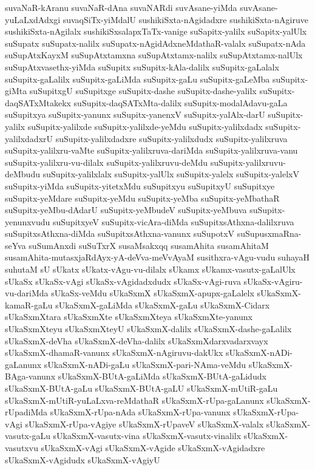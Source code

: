 {suvaNaR-kAranu
suvaNaR-dAna
suvaNARdi
suvAsane-yiMda
suvAsane-yuLaLxdAdxgi
suvaqSiTx-yiMdalU
sushikiSxta-nAgidadxre
sushikiSxta-nAgiruve
sushikiSxta-nAgilalx
sushikiSxsalapxTaTx-vanige
suSapitx-yalilx
suSapitx-yalUlx
suSupatx
suSupatx-nalilx
suSupatx-nAgidAdxneMdathaR-valalx
suSupatx-nAda
suSupAtxKayxM
suSupAtxtamxna
suSupAtxtamx-nalilx
suSupAtxtamx-nalUlx
suSupAtxvasethx-yiMda
suSupitx
suSupitx-kAla-dalilx
suSupitx-gaLalalx
suSupitx-gaLalilx
suSupitx-gaLiMda
suSupitx-gaLu
suSupitx-gaLeMba
suSupitx-giMta
suSupitxgU
suSupitxge
suSupitx-dashe
suSupitx-dashe-yalilx
suSupitx-daqSATxMtakekx
suSupitx-daqSATxMta-dalilx
suSupitx-modalAdavu-gaLa
suSupitxya
suSupitx-yanunx
suSupitx-yanenxV
suSupitx-yalAlx-darU
suSupitx-yalilx
suSupitx-yalilxde
suSupitx-yalilxde-yeMdu
suSupitx-yalilxdadx
suSupitx-yalilxdadxrU
suSupitx-yalilxdadxre
suSupitx-yalilxdudx
suSupitx-yalilxruva
suSupitx-yalilxru-vaMte
suSupitx-yalilxruva-dariMda
suSupitx-yalilxruva-vanu
suSupitx-yalilxru-vu-dilalx
suSupitx-yalilxruvu-deMdu
suSupitx-yalilxruvu-deMbudu
suSupitx-yalilxlalx
suSupitx-yalUlx
suSupitx-yalelx
suSupitx-yalelxV
suSupitx-yiMda
suSupitx-yitetxMdu
suSupitxyu
suSupitxyU
suSupitxye
suSupitx-yeMdare
suSupitx-yeMdu
suSupitx-yeMba
suSupitx-yeMbathaR
suSupitx-yeMbu-dAdarU
suSupitx-yeMbudeV
suSupitx-yeMbuva
suSupitx-yenunxvudu
suSupitxyeV
suSupitx-vicAra-diMda
suSupitxsAthxna-dalilxruva
suSupitxsAthxna-diMda
suSupitxsAthxna-vanunx
suSupotxV
suSupusxmaRna-seYva
suSumAnxdi
suSuTxrX
susaMsakxqq
susamAhita
susamAhitaM
susamAhita-mutasxjaRdAyx-yA-deVva-meVvAyaM
susithxra-vAgu-vudu
suhayaH
suhutaM
sU
sUkatx
sUkatx-vAgu-vu-dilalx
sUkamx
sUkamx-vasutx-gaLalUlx
sUkaSx
sUkaSx-vAgi
sUkaSx-vAgidadxdudx
sUkaSx-vAgi-ruva
sUkaSx-vAgiru-vu-dariMda
sUkaSx-veMdu
sUkaSxmX
sUkaSxmX-apupx-gaLalelx
sUkaSxmX-kamaR-gaLu
sUkaSxmX-gaLiMda
sUkaSxmX-gaLu
sUkaSxmX-Cidarx
sUkaSxmXtara
sUkaSxmXte
sUkaSxmXteya
sUkaSxmXte-yanunx
sUkaSxmXteyu
sUkaSxmXteyU
sUkaSxmX-dalilx
sUkaSxmX-dashe-gaLalilx
sUkaSxmX-deVha
sUkaSxmX-deVha-dalilx
sUkaSxmXdarxvadarxvayx
sUkaSxmX-dhamaR-vanunx
sUkaSxmX-nAgiruvu-dakUkx
sUkaSxmX-nADi-gaLanunx
sUkaSxmX-nADi-gaLu
sUkaSxmX-pari-NAma-veMdu
sUkaSxmX-BAga-vanunx
sUkaSxmX-BUtA-gaLiMda
sUkaSxmX-BUtA-gaLidudx
sUkaSxmX-BUtA-gaLu
sUkaSxmX-BUtA-gaLU
sUkaSxmX-mUtiR-gaLu
sUkaSxmX-mUtiR-yuLaLxva-reMdathaR
sUkaSxmX-rUpa-gaLanunx
sUkaSxmX-rUpadiMda
sUkaSxmX-rUpa-nAda
sUkaSxmX-rUpa-vanunx
sUkaSxmX-rUpa-vAgi
sUkaSxmX-rUpa-vAgiye
sUkaSxmX-rUpaveV
sUkaSxmX-valalx
sUkaSxmX-vasutx-gaLu
sUkaSxmX-vasutx-vina
sUkaSxmX-vasutx-vinalilx
sUkaSxmX-vasutxvu
sUkaSxmX-vAgi
sUkaSxmX-vAgide
sUkaSxmX-vAgidadxre
sUkaSxmX-vAgidudx
sUkaSxmX-vAgiyU
}
